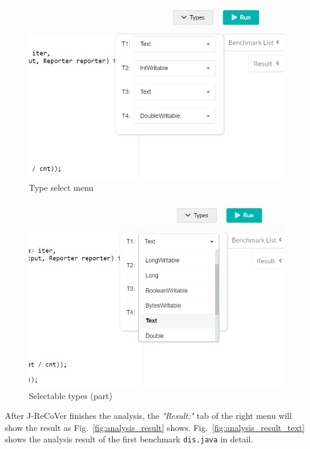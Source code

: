 \begin{figure}
\begin{center}
\includegraphics[width=.8\linewidth]{screenshots/type_select_menu}
\caption{Type select menu}
\label{fig:type_select_menu}
\end{center}
\end{figure}

\begin{figure}
\begin{center}
\includegraphics[width=.8\linewidth]{screenshots/selectable_types}
\caption{Selectable types (part)}
\label{fig:selectable_types}
\end{center}
\end{figure}

After J-ReCoVer finishes the analysis, the \emph{"Result:"} tab of the right menu will show the result as Fig.~\ref{fig:analysis_result} shows. Fig.~\ref{fig:analysis_result_text} shows the analysis result of the first benchmark \texttt{dis.java} in detail.

